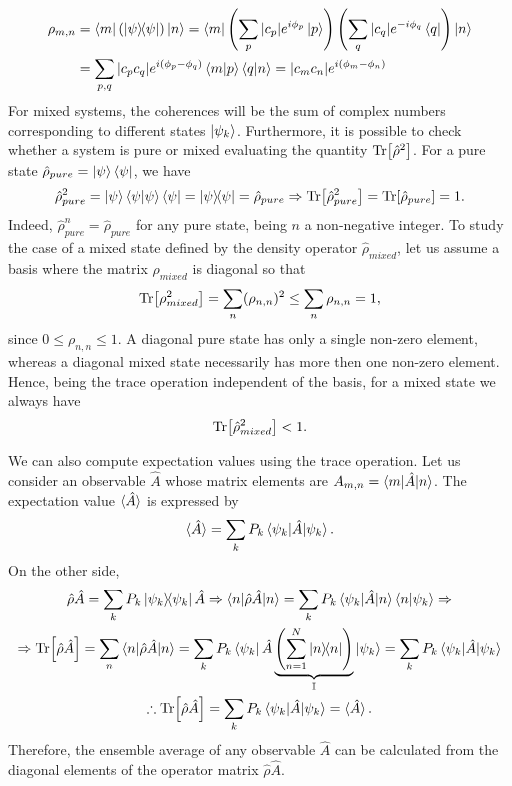 \begin{align}
	\rho_{m,n} &= \bra{m}(\ketbra{\psi}{\psi})\ket{n} = \bra{m}\left(\sum_{p} |c_p|e^{i\phi_p} \ket{p}\right)\left(\sum_{q} |c_q|e^{- i \phi_{q}} \bra{q}\right)\ket{n} \\
	&= \sum_{p,q} |c_p c_q |e^{i(\phi_p - \phi_q)} \braket{m|p} \braket{q|n} = |c_m c_n| e^{i(\phi_m - \phi_n)}
\end{align}
For mixed systems, the coherences will be the sum of complex numbers corresponding to different states $ \ket{\psi_k} $. Furthermore, it is possible to check whether a system is pure or mixed evaluating the quantity $ \Tr[\hat{\rho}^2] $. For a pure state $ \hat{\rho}_{pure} = \ket{\psi}\bra{\psi} $, we have
\begin{equation}
	\hat{\rho}_{pure}^2 = \ket{\psi}\braket{\psi|\psi}\bra{\psi} = \ketbra{\psi}{\psi} = \hat{\rho}_{pure} \Rightarrow \Tr[\hat{\rho}_{pure}^2] = \Tr[\hat{\rho}_{pure}] = 1.
\end{equation}
Indeed, $ \hat{\rho}_{pure}^n = \hat{\rho}_{pure} $ for any pure state, being $ n $ a non-negative integer. To study the case of a mixed state defined by the density operator $ \hat{\rho}_{mixed} $, let us assume a basis where the matrix $ \rho_{mixed} $ is diagonal so that
\begin{equation}
	\Tr[\rho_{mixed}^2] = \sum_n (\rho_{n,n})^2 \leq \sum_n \rho_{n,n} = 1,
\end{equation}
since $ 0 \leq \rho_{n,n} \leq 1 $. A diagonal pure state has only a single non-zero element, whereas a diagonal mixed state necessarily has more then one non-zero element. Hence, being the trace operation independent of the basis, for a mixed state we always have
\begin{equation}
	\Tr[\hat{\rho}_{mixed}^2] < 1.
\end{equation}

We can also compute expectation values using the trace operation. Let us consider an observable $ \hat{A} $ whose matrix elements are $ A_{m,n} = \braket{m|\hat{A}|n} $. The expectation value $ \braket{\hat{A}} $ is expressed by
\begin{equation}
	\braket{\hat{A}} = \sum_{k} P_k \braket{\psi_k|\hat{A}|\psi_k}.
\end{equation}
On the other side,
\begin{gather}
	\hat{\rho}\hat{A} = \sum_{k} P_k \ketbra{\psi_k}{\psi_k}\hat{A} \Rightarrow \braket{n|\hat{\rho}\hat{A}|n} = \sum_{k} P_k \braket{\psi_k|\hat{A}|n} \braket{n|\psi_k} \Rightarrow \\
	\Rightarrow \Tr[\hat{\rho}\hat{A}] = \sum_{n} \braket{n|\hat{\rho}\hat{A}|n} = \sum_{k} P_k \bra{\psi_k} \hat{A} \underbrace{\left( \sum_{n = 1}^{N} \ketbra{n}{n} \right)}_{\mathbb{I}} \ket{\psi_k} = \sum_{k} P_k \braket{\psi_k|\hat{A}|\psi_k} \\
	\therefore \Tr[\hat{\rho}\hat{A}] = \sum_{k} P_k \braket{\psi_k|\hat{A}|\psi_k} = \braket{\hat{A}}.
	\label{eq:trace-average}
\end{gather}
Therefore, the ensemble average of any observable $ \hat{A} $ can be calculated from the diagonal elements of the operator matrix $ \hat{\rho}\hat{A} $.

